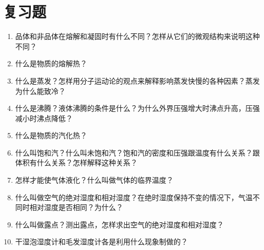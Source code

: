 \section*{复习题}
\begin{enumerate}

	\item 品体和非品体在熔解和凝固时有什么不同？怎样从它们的微观结构来说明这种不同？
	\item 什么是物质的熔解热？
		\item 什么是蒸发？怎样用分子运动论的观点来解释影响蒸发快慢的各种因素？蒸发为什么能致冷？
	\item 什么是沸腾？液体沸腾的条件是什么？为什么外界压强增大时沸点升高，压强减小时沸点降低？
	\item 什么是物质的汽化热？
	\item 什么叫饱和汽？什么叫未饱和汽？饱和汽的密度和压强跟温度有什么关系？跟体积有什么关系？怎样解释这种关系？
	\item 怎样才能使气体液化？什么叫做气体的临界温度？
	\item 什么叫做空气的绝对湿度和相对湿度？在绝时湿度保持不变的情况下，气温不同时相对湿度是否相同？为什么？
	\item 什么叫做露点？测出露点，怎样求出空气的绝对湿度和相对湿度？
	\item 干湿泡湿度计和毛发湿度计各是利用什么现象制做的？
\end{enumerate}

